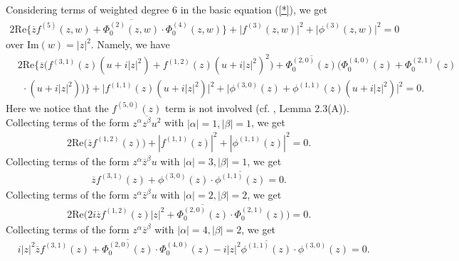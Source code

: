 \documentclass[12pt]{article}
\numberwithin{equation}{section}
\def\a{\alpha}
\def\ov{\overline}
\def\b{\beta}
\def\a{\alpha}
\def\a{\alpha}
\def\b{\beta}
\def\a{\alpha}
\def\a{\alpha}
\begin{document}
Considering terms of weighted degree $6$  in the basic equation
(\ref{*}), we get
\begin{equation}\begin{split}
2\text{Re}\Big\{\ov{z}f^{(5)}(z,w)+\ov{\Phi_0^{(2)}(z,w)}\cdot{\Phi_0^{(4)}(z,w)}\Big\}
+\big|f^{(3)}(z,w)\big|^2+\big|\phi^{(3)}(z,w)\big|^2=0
\end{split}\end{equation}
over Im$(w)=|z|^2$.  Namely, we have
\begin{equation}\begin{split}
&2\text{Re}\Big\{\ov{z}\Big(f^{(3,1)}(z)(u+i|z|^2)+f^{(1,2)}(z)(u+i|z|^2)^2\Big)
+\ov{\Phi_0^{(2,0)}(z)}\Big(\Phi_0^{(4,0)}(z)
   +\Phi_0^{(2,1)}(z)\\
   &\ \ \cdot(u+i|z|^2)\Big)\Big\}
+\big|f^{(1,1)}(z)(u+i|z|^2)\big|^2+\big|\phi^{(3,0)}(z)+\phi^{(1,1)}(z)(u+i|z|^2)\big|^2=0.
\end{split}\end{equation}
{Here we notice that the $f^{(5,0)}(z)$ term is not involved (cf.
\cite{HJX1}, Lemma 2.3(A)).} Collecting terms of  the form
$z^{\a}\ov{z^{\b}}u^2$ with $|\a|=1,|\b|=1$, we get
\begin{equation}\begin{split}\label{112}
&2\text{Re}\big(\ov{z}f^{(1,2)}(z)\big)+|f^{(1,1)}(z)|^2+|\phi^{(1,1)}(z)|^2=0.
\end{split}\end{equation}
Collecting terms of  the form $z^{\a}\ov{z}^{\b}u$ with
$|\a|=3,|\b|=1$, we get
\begin{equation}\begin{split}\label{311}
&\ov{z}f^{(3,1)}(z)+\phi^{(3,0)}(z)\cdot\ov{\phi^{(1,1)}(z)}=0.
\end{split}\end{equation}
Collecting terms of  the form $z^{\a}\ov{z}^{\b}u$ with
$|\a|=2,|\b|=2$, we get
\begin{equation}\begin{split}\label{221}
&2\text{Re}\Big(2i\ov{z}f^{(1,2)}(z)|z|^2+\ov{\Phi_0^{(2,0)}(z)}\cdot
{\Phi_0^{(2,1)}(z)}\Big)=0.
\end{split}\end{equation}
Collecting terms of the form  $z^{\a}\ov{z}^{\b}$ with
$|\a|=4,|\b|=2$, we get
\begin{equation}\begin{split}\label{420}
&i|z|^2\ov{z}f^{(3,1)}(z)+\ov{\Phi_0^{(2,0)}(z)}\cdot{\Phi_0^{(4,0)}(z)}-i|z|^2\ov{\phi^{(1,1)}(z)}\cdot
{\phi^{(3,0)}(z)}=0.
\end{split}\end{equation}
\end{document}
